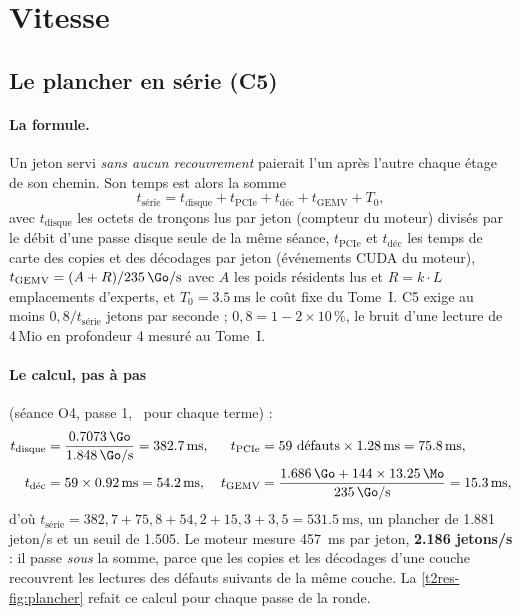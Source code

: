 \section{Vitesse}\label{t2res-sec:vitesse}

\subsection{Le plancher en série (C5)}\label{t2res-sec:c5}

\paragraph{La formule.} Un jeton servi \emph{sans aucun recouvrement} paierait l'un après l'autre chaque étage de son chemin. Son temps est alors la somme
\[
t_{\text{série}} = t_{\text{disque}} + t_{\text{PCIe}} + t_{\text{déc}} + t_{\text{GEMV}} + T_0,
\]
avec $t_{\text{disque}}$ les octets de tronçons lus par jeton (compteur du moteur) divisés par le débit d'une passe disque seule de la même séance, $t_{\text{PCIe}}$ et $t_{\text{déc}}$ les temps de carte des copies et des décodages par jeton (événements CUDA du moteur), $t_{\text{GEMV}} = (A + R)/\SI{235}{\Go\per\second}$ avec $A$ les poids résidents lus et $R = k \cdot L$ emplacements d'experts, et $T_0 = \SI{3.5}{\milli\second}$ le coût fixe du Tome~I. C5 exige au moins $0{,}8 / t_{\text{série}}$ jetons par seconde ; $0{,}8 = 1 - 2 \times 10\,\%$, le bruit d'une lecture de 4\,Mio en profondeur 4 mesuré au Tome~I.

\paragraph{Le calcul, pas à pas} (séance O4, passe 1, \mes~pour chaque terme) :
\begin{align*}
t_{\text{disque}} &= \frac{\SI{0.7073}{\Go}}{\SI{1.848}{\Go\per\second}} = \SI{382.7}{\milli\second}, &
t_{\text{PCIe}} &= 59 \text{ défauts} \times \SI{1.28}{\milli\second} = \SI{75.8}{\milli\second}, \\
t_{\text{déc}} &= 59 \times \SI{0.92}{\milli\second} = \SI{54.2}{\milli\second}, &
t_{\text{GEMV}} &= \frac{\SI{1.686}{\Go} + 144 \times \SI{13.25}{\Mo}}{\SI{235}{\Go\per\second}} = \SI{15.3}{\milli\second},
\end{align*}
d'où $t_{\text{série}} = 382{,}7 + 75{,}8 + 54{,}2 + 15{,}3 + 3{,}5 = \SI{531.5}{\milli\second}$, un plancher de \num{1.881} jeton/s et un seuil de \num{1.505}. Le moteur mesure \SI{457}{\milli\second} par jeton, \textbf{\num{2.186} jetons/s} : il passe \emph{sous} la somme, parce que les copies et les décodages d'une couche recouvrent les lectures des défauts suivants de la même couche. La \cref{t2res-fig:plancher} refait ce calcul pour chaque passe de la ronde.

